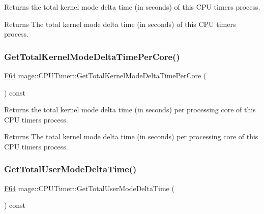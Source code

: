 Returns the total kernel mode delta time (in seconds) of this C\+PU timer\textquotesingle{}s process.

\begin{DoxyReturn}{Returns}
The total kernel mode delta time (in seconds) of this C\+PU timer\textquotesingle{}s process. 
\end{DoxyReturn}
\hypertarget{classmage_1_1_c_p_u_timer_ab1128ed37f45445afdfc6d539d721616}{}\label{classmage_1_1_c_p_u_timer_ab1128ed37f45445afdfc6d539d721616} 
\subsubsection{\texorpdfstring{Get\+Total\+Kernel\+Mode\+Delta\+Time\+Per\+Core()}{GetTotalKernelModeDeltaTimePerCore()}}
{\footnotesize\ttfamily \hyperlink{namespacemage_ad26233bbec640deda836e572c1a23708}{F64} mage\+::\+C\+P\+U\+Timer\+::\+Get\+Total\+Kernel\+Mode\+Delta\+Time\+Per\+Core (\begin{DoxyParamCaption}{ }\end{DoxyParamCaption}) const\hspace{0.3cm}{\ttfamily [noexcept]}}

Returns the total kernel mode delta time (in seconds) per processing core of this C\+PU timer\textquotesingle{}s process.

\begin{DoxyReturn}{Returns}
The total kernel mode delta time (in seconds) per processing core of this C\+PU timer\textquotesingle{}s process. 
\end{DoxyReturn}
\hypertarget{classmage_1_1_c_p_u_timer_aeff891594a11dba36c73442d04a430c8}{}\label{classmage_1_1_c_p_u_timer_aeff891594a11dba36c73442d04a430c8} 
\subsubsection{\texorpdfstring{Get\+Total\+User\+Mode\+Delta\+Time()}{GetTotalUserModeDeltaTime()}}
{\footnotesize\ttfamily \hyperlink{namespacemage_ad26233bbec640deda836e572c1a23708}{F64} mage\+::\+C\+P\+U\+Timer\+::\+Get\+Total\+User\+Mode\+Delta\+Time (\begin{DoxyParamCaption}{ }\end{DoxyParamCaption}) const\hspace{0.3cm}{\ttfamily [noexcept]}}


